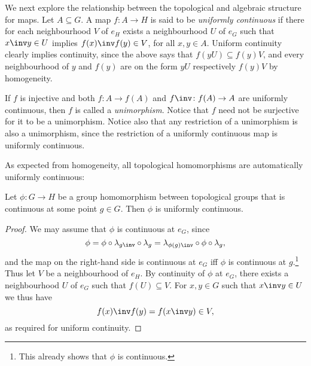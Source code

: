 \documentclass[article, a4paper, 11pt, oneside]{memoir}
\numberwithin{equation}{chapter}
\begin{document}

We next explore the relationship between the topological and algebraic structure for maps. Let $A \subseteq G$. A map $f \colon A \to H$ is said to be \emph{uniformly continuous} if there for each neighbourhood $V$ of $e_H$ exists a neighbourhood $U$ of $e_G$ such that $x\inv y \in U$ implies $f(x)\inv f(y) \in V$, for all $x,y \in A$. Uniform continuity clearly implies continuity, since the above says that $f(yU) \subseteq f(y)V$, and every neighbourhood of $y$ and $f(y)$ are on the form $yU$ respectively $f(y)V$ by homogeneity.

If $f$ is injective and both $f \colon A \to f(A)$ and $f\inv \colon f(A) \to A$ are uniformly continuous, then $f$ is called a \emph{unimorphism}. Notice that $f$ need not be surjective for it to be a unimorphism. Notice also that any restriction of a unimorphism is also a unimorphism, since the restriction of a uniformly continuous map is uniformly continuous.

As expected from homogeneity, all topological homomorphisms are automatically uniformly continuous:

\begin{proposition}
    \label{thm:group-homomorphism-continuity}
    Let $\phi \colon G \to H$ be a group homomorphism between topological groups that is continuous at some point $g \in G$. Then $\phi$ is uniformly continuous.
\end{proposition}

\begin{proof}
    We may assume that $\phi$ is continuous at $e_G$, since
    \begin{equation*}
        \phi
            = \phi \circ \leftmult_{g\inv} \circ \leftmult_{g}
            = \leftmult_{\phi(g)\inv} \circ \phi \circ \leftmult_{g},
    \end{equation*}
    and the map on the right-hand side is continuous at $e_G$ iff $\phi$ is continuous at $g$.\footnote{This already shows that $\phi$ is continuous.} Thus let $V$ be a neighbourhood of $e_H$. By continuity of $\phi$ at $e_G$, there exists a neighbourhood $U$ of $e_G$ such that $f(U) \subseteq V$. For $x,y \in G$ such that $x\inv y \in U$ we thus have
    \begin{equation*}
        f(x)\inv f(y)
            = f(x\inv y)
            \in V,
    \end{equation*}
    as required for uniform continuity.
\end{proof}
\end{document}

